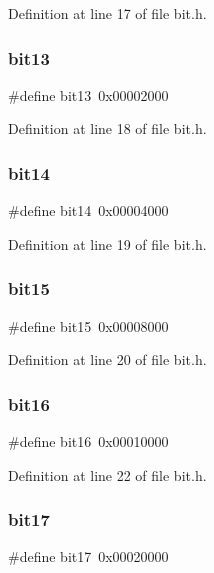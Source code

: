 Definition at line 17 of file bit.\+h.

\mbox{\label{bit_8h_a6ddc02d64c45d0f5666a1fb99d865263}} 
\subsubsection{bit13}
{\footnotesize\ttfamily \#define bit13~0x00002000}



Definition at line 18 of file bit.\+h.

\mbox{\label{bit_8h_a95eb29ccb2c84a642ca422e014b20c4c}} 
\subsubsection{bit14}
{\footnotesize\ttfamily \#define bit14~0x00004000}



Definition at line 19 of file bit.\+h.

\mbox{\label{bit_8h_a5100155514b8dfe666557013919eb2c2}} 
\subsubsection{bit15}
{\footnotesize\ttfamily \#define bit15~0x00008000}



Definition at line 20 of file bit.\+h.

\mbox{\label{bit_8h_a02d18dba2d48a78ff20634c8789feadd}} 
\subsubsection{bit16}
{\footnotesize\ttfamily \#define bit16~0x00010000}



Definition at line 22 of file bit.\+h.

\mbox{\label{bit_8h_ac1fa987c65371b7c6ce676ba15c25e26}} 
\subsubsection{bit17}
{\footnotesize\ttfamily \#define bit17~0x00020000}



